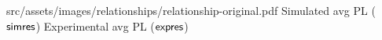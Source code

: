 
\relatplot
{src/assets/images/relationships/relationship-original.pdf}
{Simulated avg PL ($\mathsf{simres}$)}
{Experimental avg PL ($\mathsf{expres}$)}